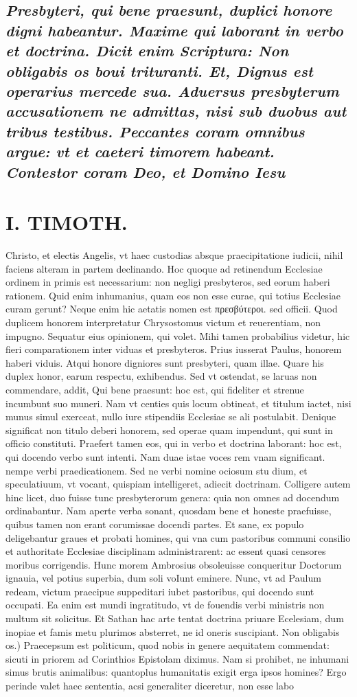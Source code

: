 \documentclass{article}
\begin{document}
\begin{pages}
\subsection*{\textit{Presbyteri, qui bene praesunt, duplici honore digni habeantur. Maxime qui laborant in verbo et doctrina. Dicit enim Scriptura: Non obligabis os boui trituranti. Et, Dignus est operarius mercede sua. Aduersus presbyterum accusationem ne admittas, nisi sub duobus aut tribus testibus. Peccantes coram omnibus argue: vt et caeteri timorem habeant. Contestor coram Deo, et Domino Iesu }}
\section*{I. TIMOTH. }
\marginpar{[ p.66 ]}\pstart Christo, et electis Angelis, vt haec custodias absque praecipitatione iudicii, nihil faciens alteram in partem declinando.  \pend\pstart Hoc quoque ad retinendum Ecclesiae ordinem in primis est necessarium: non negligi presbyteros, sed eorum haberi rationem. Quid enim inhumanius, quam eos non esse curae, qui totius Ecclesiae curam gerunt? Neque enim hic aetatis nomen est πρεσβύτεροι. sed officii. Quod duplicem honorem interpretatur Chrysostomus victum et reuerentiam, non impugno. Sequatur eius opinionem, qui volet. Mihi tamen probabilius videtur, hic fieri comparationem inter viduas et presbyteros. Prius iusserat Paulus, honorem haberi viduis. Atqui honore digniores sunt presbyteri, quam illae. Quare his duplex honor, earum respectu, exhibendus. Sed vt ostendat, se laruas non commendare, addit, Qui bene praesunt: hoc est, qui fideliter et strenue incumbunt suo muneri. Nam vt centies quis locum obtineat, et titulum iactet, nisi munus simul exerceat, nullo iure stipendiis Ecclesiae se ali postulabit. Denique significat non titulo deberi honorem, sed operae quam impendunt, qui sunt in officio constituti. Praefert tamen eos, qui in verbo et doctrina laborant: hoc est, qui docendo verbo sunt intenti. Nam duae istae voces rem vnam significant. nempe verbi praedicationem. Sed ne verbi nomine ociosum stu dium, et speculatiuum, vt vocant, quispiam intelligeret, adiecit doctrinam. Colligere autem hinc licet, duo fuisse tunc presbyterorum genera: quia non omnes ad docendum ordinabantur. Nam aperte verba sonant, quosdam bene et honeste praefuisse, quibus tamen non erant corumissae docendi partes. Et sane, ex populo deligebantur graues et probati homines, qui vna cum pastoribus communi consilio et authoritate Ecclesiae disciplinam administrarent: ac essent quasi censores moribus corrigendis. Hunc morem Ambrosius obsoleuisse conqueritur Doctorum ignauia, vel potius superbia, dum soli voIunt eminere. Nunc, vt ad Paulum redeam, victum praecipue suppeditari iubet pastoribus, qui docendo sunt occupati. Ea enim est mundi ingratitudo, vt de fouendis verbi ministris non multum sit solicitus. Et Sathan hac arte tentat doctrina priuare Ecelesiam, dum inopiae et famis metu plurimos absterret, ne id oneris suscipiant.  \pend\pstart Non obligabis os.) Praecepsum est politicum, quod nobis in genere aequitatem commendat: sicuti in priorem ad Corinthios Epistolam diximus. Nam si prohibet, ne inhumani simus brutis animalibus: quantoplus humanitatis exigit erga ipsos homines? Ergo perinde valet haec sententia, acsi generaliter diceretur, non esse labo\pend

\end{pages}
\end{document}
